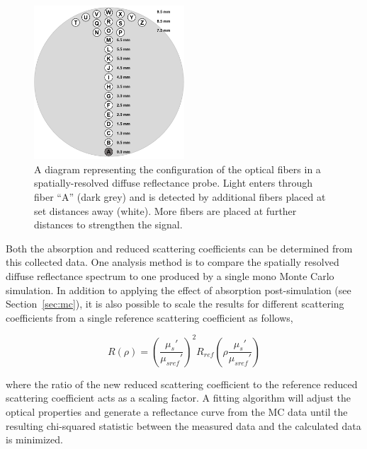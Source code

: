 \begin{figure}
	\centering \includegraphics[width=0.5\textwidth]{figures/intro-srdr.png}
	\caption[Probe for spatially-resolved diffuse reflectance]{\label{fig:intro-srdr}A diagram representing the configuration of the optical fibers in a spatially-resolved diffuse reflectance probe. Light enters through fiber “A” (dark grey) and is detected by additional fibers placed at set distances away (white). More fibers are placed at further distances to strengthen the signal.}
\end{figure}

Both the absorption and reduced scattering coefficients can be determined from this collected data. One analysis method is to compare the spatially resolved diffuse reflectance spectrum to one produced by a single mono Monte Carlo simulation. In addition to applying the effect of absorption post-simulation (see Section~\ref{sec:mc}), it is also possible to scale the results for different scattering coefficients from a single reference scattering coefficient as follows,\cite{Kienle1996a}

\begin{equation}
	R(\rho) = \left(\frac{\mu_s'}{\mu_{sref}'}\right)^2 R_{ref}\left(\rho\frac{\mu_s'}{\mu_{sref}'}\right)
\end{equation}

\noindent where the ratio of the new reduced scattering coefficient to the reference reduced scattering coefficient acts as a scaling factor. A fitting algorithm will adjust the optical properties and generate a reflectance curve from the MC data until the resulting chi-squared statistic between the measured data and the calculated data is minimized.

